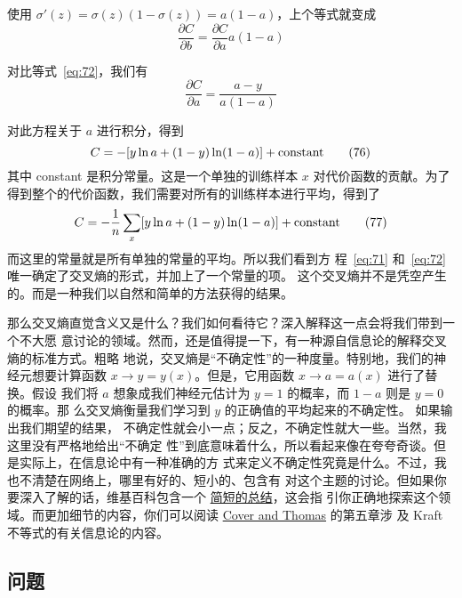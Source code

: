 使用 $\sigma'(z) = \sigma(z)(1-\sigma(z)) = a(1-a)$，上个等式就变成
\begin{equation}
  \frac{\partial C}{\partial b} = \frac{\partial C}{\partial a}
  a(1-a)
  \label{eq:74}\tag{74}
\end{equation}

对比等式~\eqref{eq:72}，我们有
\begin{equation}
  \frac{\partial C}{\partial a} = \frac{a-y}{a(1-a)}
  \label{eq:75}\tag{75}
\end{equation}

对此方程关于 $a$ 进行积分，得到
\begin{equation}
  C = -[y \ln a + (1-y) \ln (1-a)]+ {\rm constant}
  \label{eq:76}\tag{76}
\end{equation}
其中 {\rm constant} 是积分常量。这是一个单独的训练样本 $x$ 对代价函数的贡献。为了
得到整个的代价函数，我们需要对所有的训练样本进行平均，得到了
\begin{equation}
  C = -\frac{1}{n} \sum_x [y \ln a +(1-y) \ln(1-a)] + {\rm constant}
  \label{eq:77}\tag{77}
\end{equation}
而这里的常量就是所有单独的常量的平均。所以我们看到方
程~\eqref{eq:71} 和~\eqref{eq:72} 唯一确定了交叉熵的形式，并加上了一个常量的项。
这个交叉熵并不是凭空产生的。而是一种我们以自然和简单的方法获得的结果。

那么交叉熵直觉含义又是什么？我们如何看待它？深入解释这一点会将我们带到一个不大愿
意讨论的领域。然而，还是值得提一下，有一种源自信息论的解释交叉熵的标准方式。粗略
地说，交叉熵是``不确定性''的一种度量。特别地，我们的神经元想要计算函数 $x
\rightarrow y = y(x)$。但是，它用函数 $x \rightarrow a = a(x)$ 进行了替换。假设
我们将 $a$ 想象成我们神经元估计为 $y = 1$ 的概率，而 $1-a$ 则是 $y=0$ 的概率。那
么交叉熵衡量我们学习到 $y$ 的正确值的平均起来的不确定性。 如果输出我们期望的结果，
不确定性就会小一点；反之，不确定性就大一些。当然，我这里没有严格地给出``不确定
性''到底意味着什么，所以看起来像在夸夸奇谈。但是实际上，在信息论中有一种准确的方
式来定义不确定性究竟是什么。不过，我也不清楚在网络上，哪里有好的、短小的、包含有
对这个主题的讨论。但如果你要深入了解的话，维基百科包含一个%
\href{http://en.wikipedia.org/wiki/Cross_entropy#Motivation}{简短的总结}，这会指
引你正确地探索这个领域。而更加细节的内容，你们可以阅读
\href{http://books.google.ca/books?id=VWq5GG6ycxMC}{Cover and Thomas} 的第五章涉
及 Kraft 不等式的有关信息论的内容。

\subsection*{问题}

